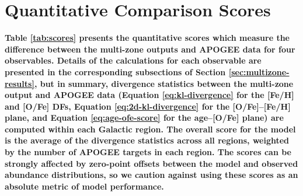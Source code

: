 \documentclass[twocolumn,twocolappendix,linenumbers]{aastex631}
\begin{document}
\section{\bf Quantitative Comparison Scores}
\label{app:quantitative-scores}

\vspace{-24pt}

{\bf Table \ref{tab:scores} presents the quantitative scores which measure the difference between the multi-zone outputs and APOGEE data for four observables. Details of the calculations for each observable are presented in the corresponding subsections of Section \ref{sec:multizone-results}, but in summary, divergence statistics between the multi-zone output and APOGEE data (Equation \ref{eq:kl-divergence} for the [Fe/H] and [O/Fe] DFs, Equation \ref{eq:2d-kl-divergence} for the [O/Fe]--[Fe/H] plane, and Equation \ref{eq:age-ofe-score} for the age--[O/Fe] plane) are computed within each Galactic region. The overall score for the model is the average of the divergence statistics across all regions, weighted by the number of APOGEE targets in each region. The scores can be strongly affected by zero-point offsets between the model and observed abundance distributions, so we caution against using these scores as an absolute metric of model performance.}


\end{document}

